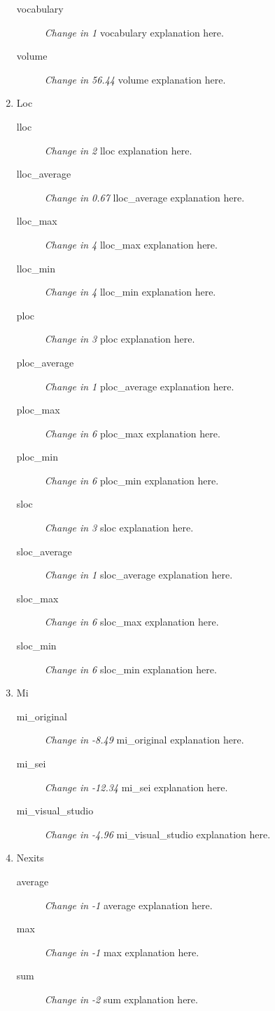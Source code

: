 \begin{enumerate}
\begin{description}
          \item [vocabulary] \textit{Change in 1} vocabulary explanation here.
          \item [volume] \textit{Change in 56.44} volume explanation here.
        \end{description}
  \item Loc
        \begin{description}
          \item [lloc] \textit{Change in 2} lloc explanation here.
          \item [lloc\_average] \textit{Change in 0.67} lloc\_average explanation here.
          \item [lloc\_max] \textit{Change in 4} lloc\_max explanation here.
          \item [lloc\_min] \textit{Change in 4} lloc\_min explanation here.
          \item [ploc] \textit{Change in 3} ploc explanation here.
          \item [ploc\_average] \textit{Change in 1} ploc\_average explanation here.
          \item [ploc\_max] \textit{Change in 6} ploc\_max explanation here.
          \item [ploc\_min] \textit{Change in 6} ploc\_min explanation here.
          \item [sloc] \textit{Change in 3} sloc explanation here.
          \item [sloc\_average] \textit{Change in 1} sloc\_average explanation here.
          \item [sloc\_max] \textit{Change in 6} sloc\_max explanation here.
          \item [sloc\_min] \textit{Change in 6} sloc\_min explanation here.
        \end{description}
  \item Mi
        \begin{description}
          \item [mi\_original] \textit{Change in -8.49} mi\_original explanation here.
          \item [mi\_sei] \textit{Change in -12.34} mi\_sei explanation here.
          \item [mi\_visual\_studio] \textit{Change in -4.96} mi\_visual\_studio explanation here.
        \end{description}
  \item Nexits
        \begin{description}
          \item [average] \textit{Change in -1} average explanation here.
          \item [max] \textit{Change in -1} max explanation here.
          \item [sum] \textit{Change in -2} sum explanation here.
        \end{description}
\end{enumerate}
